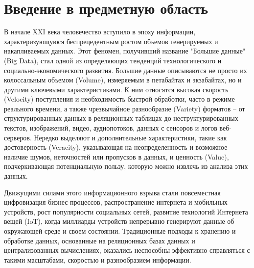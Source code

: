 \chapter{Введение в предметную область} \label{ch2}

В начале XXI века человечество вступило в эпоху информации,
характеризующуюся беспрецедентным ростом объемов генерируемых и накапливаемых данных.
Этот феномен, получивший название "Большие данные" (Big Data), стал одной из определяющих тенденций технологического и социально-экономического развития.
Большие данные описываются не просто их колоссальным объемом (Volume), измеряемым в петабайтах и экзабайтах, но и другими ключевыми характеристиками.
К ним относятся высокая скорость (Velocity) поступления и необходимость быстрой обработки, часто в режиме реального времени,
а также чрезвычайное разнообразие (Variety) форматов – от структурированных данных в реляционных таблицах до неструктурированных текстов,
изображений, видео, аудиопотоков, данных с сенсоров и логов веб-серверов.
Нередко выделяют и дополнительные характеристики, такие как достоверность (Veracity),
указывающая на неопределенность и возможное наличие шумов, неточностей или пропусков в данных, и ценность (Value), подчеркивающая потенциальную пользу, которую можно извлечь из анализа этих данных\cite{laney_3d_data_management}.

Движущими силами этого информационного взрыва стали повсеместная цифровизация бизнес-процессов, распространение интернета и мобильных устройств, рост популярности социальных сетей, развитие технологий Интернета вещей (IoT), когда миллиарды устройств непрерывно генерируют данные об окружающей среде и своем состоянии. Традиционные подходы к хранению и обработке данных, основанные на реляционных базах данных и централизованных вычислениях, оказались неспособны эффективно справляться с такими масштабами, скоростью и разнообразием информации\cite{white_hadoop}.

